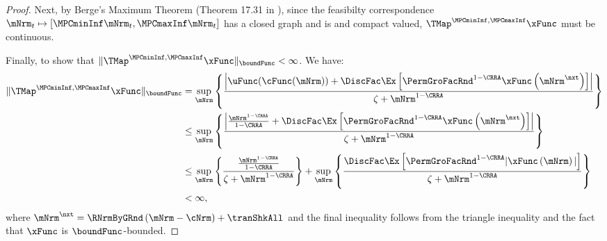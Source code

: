 \documentclass[\econtexRoot/BufferStockTheory]{subfiles}
\begin{document}
\begin{proof}
Next, by Berge's Maximum Theorem (Theorem 17.31 in \cite{Aliprantis2005}), since the feasibilty correspondence $\mNrm_{t}\mapsto [\MPCminInf \mNrm_{t}, \MPCmaxInf \mNrm_{t}]$ has a closed graph and is and compact valued, $\TMap^{\MPCminInf, \MPCmaxInf}{\mathfrak{\xFunc}}$ must be continuous. 

Finally, to show that $\Vert \TMap^{\MPCminInf, \MPCmaxInf}{\mathfrak{\xFunc}}\Vert_{\boundFunc}<\infty$. We have:
%
%
\begin{align}
\Vert \TMap^{\MPCminInf, \MPCmaxInf}{\mathfrak{\xFunc}}\Vert_{\boundFunc} & = \sup_{\mNrm} \left\{\frac{\left| \uFunc(\cFunc(\mNrm)) + \DiscFac \Ex\left[ {\PermGroFacRnd}^{1-\CRRA }{\mathfrak{\xFunc}} \left( {\mNrm^{\nxt}}\right) \right] \right|}{\zeta + \mNrm^{1-\CRRA}}\right\} \\
& \leq  \sup_{\mNrm} \left\{\frac{\left| \frac{\mNrm^{1-\CRRA}}{1-\CRRA} + \DiscFac \Ex\left[ {\PermGroFacRnd}^{1-\CRRA }{\mathfrak{\xFunc}} \left( {\mNrm^{\nxt}}\right) \right] \right|}{\zeta + \mNrm^{1-\CRRA}}\right\} \\ 
& \leq \sup_{\mNrm} \left\{\frac{\frac{\mNrm^{1-\CRRA}}{1-\CRRA}}{\zeta + \mNrm^{1-\CRRA}}\right\} + \sup_{\mNrm} \left\{\frac{\DiscFac \Ex\left[ {\PermGroFacRnd}^{1-\CRRA }{\vert \mathfrak{\xFunc}} \left( {\mNrm}\right)\vert  \right]}{\zeta + \mNrm^{1-\CRRA}}\right\}\\
& <\infty, 
\end{align}
%
where ${\mNrm}^{\nxt} = \RNrmByGRnd\left(\mNrm - \cNrm\right) + \tranShkAll$ and the final inequality follows from the triangle inequality and the fact that $\xFunc$ is $\boundFunc$-bounded. 
                                           
\end{proof}
\end{document}
